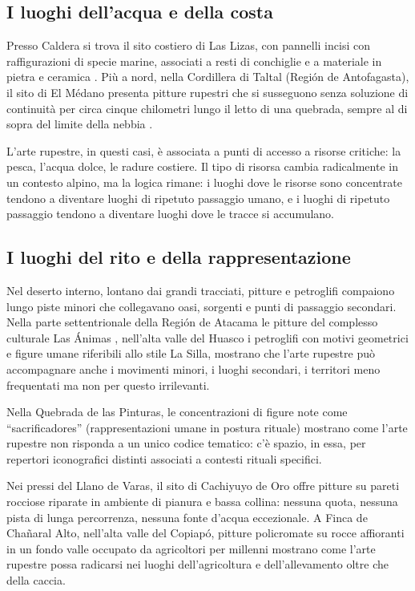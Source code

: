 \subsection{I luoghi dell'acqua e della costa}

Presso Caldera si trova il sito costiero di Las Lizas, con pannelli incisi con raffigurazioni di specie marine, associati a resti di conchiglie e a materiale in pietra e ceramica \citep{niemeyer1985}. Più a nord, nella Cordillera di Taltal (Región de Antofagasta), il sito di El Médano presenta pitture rupestri che si susseguono senza soluzione di continuità per circa cinque chilometri lungo il letto di una quebrada, sempre al di sopra del limite della nebbia \citep{museo_precolombino_medano}.

L'arte rupestre, in questi casi, è associata a punti di accesso a risorse critiche: la pesca, l'acqua dolce, le radure costiere. Il tipo di risorsa cambia radicalmente in un contesto alpino, ma la logica rimane: i luoghi dove le risorse sono concentrate tendono a diventare luoghi di ripetuto passaggio umano, e i luoghi di ripetuto passaggio tendono a diventare luoghi dove le tracce si accumulano.

\subsection{I luoghi del rito e della rappresentazione}

Nel deserto interno, lontano dai grandi tracciati, pitture e petroglifi compaiono lungo piste minori che collegavano oasi, sorgenti e punti di passaggio secondari. Nella parte settentrionale della Región de Atacama le pitture del complesso culturale Las Ánimas \citep{memoriachilena_rupestre}, nell'alta valle del Huasco i petroglifi con motivi geometrici e figure umane riferibili allo stile La Silla, mostrano che l'arte rupestre può accompagnare anche i movimenti minori, i luoghi secondari, i territori meno frequentati ma non per questo irrilevanti.

Nella Quebrada de las Pinturas, le concentrazioni di figure note come ``sacrificadores'' (rappresentazioni umane in postura rituale) mostrano come l'arte rupestre non risponda a un unico codice tematico: c'è spazio, in essa, per repertori iconografici distinti associati a contesti rituali specifici.

Nei pressi del Llano de Varas, il sito di Cachiyuyo de Oro offre pitture su pareti rocciose riparate in ambiente di pianura e bassa collina: nessuna quota, nessuna pista di lunga percorrenza, nessuna fonte d'acqua eccezionale. A Finca de Chañaral Alto, nell'alta valle del Copiapó, pitture policromate su rocce affioranti in un fondo valle occupato da agricoltori per millenni mostrano come l'arte rupestre possa radicarsi nei luoghi dell'agricoltura e dell'allevamento oltre che della caccia.

